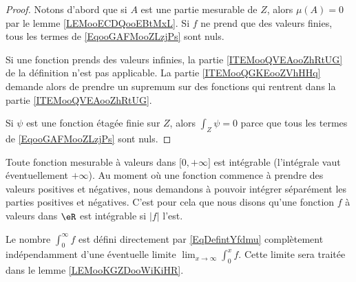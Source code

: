 \begin{proof}
	Notons d'abord que si \( A\) est une partie mesurable de \( Z\), alors \( \mu(A)=0\) par le lemme \ref{LEMooECDQooEBtMxL}. Si \( f\) ne prend que des valeurs finies, tous les termes de \eqref{EqooGAFMooZLzjPs} sont nuls.

	Si une fonction prends des valeurs infinies, la partie \ref{ITEMooQVEAooZhRtUG} de la définition n'est pas applicable. La partie \ref{ITEMooQGKEooZVhHHq} demande alors de prendre un supremum sur des fonctions qui rentrent dans la partie \ref{ITEMooQVEAooZhRtUG}.

	Si \( \psi\) est une fonction étagée finie sur \( Z\), alors \( \int_Z\psi=0\) parce que tous les termes de \eqref{EqooGAFMooZLzjPs} sont nuls.
\end{proof}


\begin{remark}
	Toute fonction mesurable à valeurs dans \(  \mathopen[ 0 , +\infty \mathclose]   \) est intégrable (l'intégrale vaut éventuellement \( +\infty\)). Au moment où une fonction commence à prendre des valeurs positives et négatives, nous demandons à pouvoir intégrer séparément les parties positives et négatives. C'est pour cela que nous disons qu'une fonction \( f\) à valeurs dans \( \eR\) est intégrable si \( | f |\) l'est.
\end{remark}

\begin{normaltext}
	Le nombre \( \int_0^{\infty}f\) est défini directement par \eqref{EqDefintYfdmu} complètement indépendamment d'une éventuelle limite \( \lim_{x\to \infty} \int_{0}^xf\).
	Cette limite sera traitée dans le lemme \ref{LEMooKGZDooWiKiHR}.
\end{normaltext}

